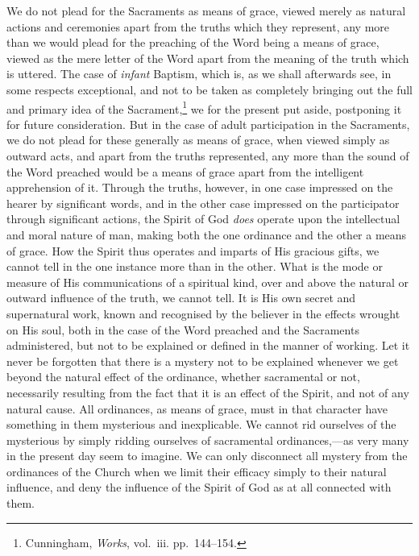 \documentclass[
  english,
]{book}
\begin{document}
We do not plead for the Sacraments as means of grace, viewed merely as natural actions and ceremonies apart from the truths which they represent, any more than we would plead for the preaching of the Word being a means of grace, viewed as the mere letter of the Word apart from the meaning of the truth which is uttered. The case of \emph{infant} Baptism, which is, as we shall afterwards see, in some respects exceptional, and not to be taken as completely bringing out the full and primary idea of the Sacrament,\footnote{Cunningham, \emph{Works}, vol.~iii. pp.~144--154.} we for the present put aside, postponing it for future consideration. But in the case of adult participation in the Sacraments, we do not plead for these generally as means of grace, when viewed simply as outward acts, and apart from the truths represented, any more than the sound of the Word preached would be a means of grace apart from the intelligent apprehension of it. Through the truths, however, in one case impressed on the hearer by significant words, and in the other case impressed on the participator through significant actions, the Spirit of God \emph{does} operate upon the intellectual and moral nature of man, making both the one ordinance and the other a means of grace. How the Spirit thus operates and imparts of His gracious gifts, we cannot tell in the one instance more than in the other. What is the mode or measure of His communications of a spiritual kind, over and above the natural or outward influence of the truth, we cannot tell. It is His own secret and supernatural work, known and recognised by the believer in the effects wrought on His soul, both in the case of the Word preached and the Sacraments administered, but not to be explained or defined in the manner of working. Let it never be forgotten that there is a mystery not to be explained whenever we get beyond the natural effect of the ordinance, whether sacramental or not, necessarily resulting from the fact that it is an effect of the Spirit, and not of any natural cause. All ordinances, as means of grace, must in that character have something in them mysterious and inexplicable. We cannot rid ourselves of the mysterious by simply ridding ourselves of sacramental ordinances,---as very many in the present day seem to imagine. We can only disconnect all mystery from the ordinances of the Church when we limit their efficacy simply to their natural influence, and deny the influence of the Spirit of God as at all connected with them.
\end{document}
